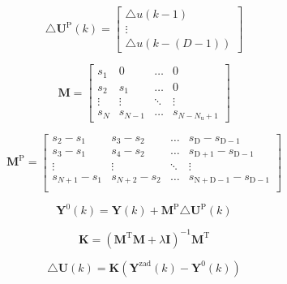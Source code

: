 \begin{equation}
\triangle \boldsymbol{U}^{\mathrm{P}}(k)=\left[
\begin{array}{c}
\triangle u(k-1)\\
\vdots\\
\triangle u(k-(D-1))
\end{array}
\right]
\label{dUp}
\end{equation}

\begin{equation}
\boldsymbol{M}=\left[
\begin{array}
{cccc}
s_{1} & 0 & \ldots & 0\\
s_{2} & s_{1} & \ldots & 0\\
\vdots & \vdots & \ddots & \vdots\\
s_{N} & s_{N-1} & \ldots &  s_{N-N_{\mathrm{u}}+1}
\end{array}
\right]
\label{Marray}
\end{equation}

\begin{equation}
\boldsymbol{M}^{\mathrm{P}}=\left[
\begin{array}
{cccc}
s_{2} - s_{1} & s_{3} - s_{2} & \ldots & s_{\mathrm{D}} - s_{\mathrm{D-1}}\\
s_{3} - s_{1} & s_{4} - s_{2} & \ldots & s_{\mathrm{D+1}} - s_{\mathrm{D-1}}\\
\vdots & \vdots & \ddots & \vdots\\
s_{N+1} - s_{1} & s_{N+2} - s_{2} & \ldots & s_{\mathrm{N+D-1}} - s_{\mathrm{D-1}}\\
\end{array}
\right]
\label{MParray}
\end{equation}

\begin{equation}
\boldsymbol{Y}^{0}(k) = \boldsymbol{Y}(k) + \boldsymbol{M}^{\mathrm{P}} \triangle \boldsymbol{U}^{\mathrm{P}}(k)
\label{Y0k}
\end{equation}

\begin{equation}
\boldsymbol{K} = (\boldsymbol{M}^{\mathrm{T}} \boldsymbol{M} + \lambda \boldsymbol{I})^{-1} \boldsymbol{M}^{\mathrm{T}}
\label{Karray}
\end{equation}

\begin{equation}
\triangle \boldsymbol{U}(k) = \boldsymbol{K}(\boldsymbol{Y}^{\mathrm{zad}}(k) - \boldsymbol{Y}^{0}(k))
\label{dukdmc}
\end{equation}

